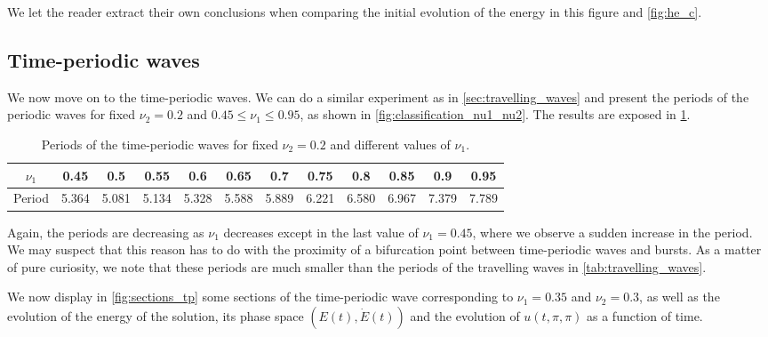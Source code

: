 \documentclass[twoside]{article}
\begin{document}
We let the reader extract their own conclusions when comparing the initial evolution of the energy in this figure and \cref{fig:he_c}.
\subsection{Time-periodic waves}\label{sec:time_periodic_waves}
We now move on to the time-periodic waves. We can do a similar experiment as in \cref{sec:travelling_waves} and present the periods of the periodic waves for fixed $\nu_2=0.2$ and $0.45\leq \nu_1\leq 0.95$, as shown in \cref{fig:classification_nu1_nu2}. The results are exposed in \cref{tab:time_periodic_waves}.

\begin{table}[H]
  \centering
  \begin{tabular}{|c||ccccccccccc|}
    \hline
    $\nu_1$ & 0.45  & 0.5   & 0.55  & 0.6   & 0.65  & 0.7   & 0.75  & 0.8   & 0.85  & 0.9   & 0.95  \\ \hline
    Period  & 5.364 & 5.081 & 5.134 & 5.328 & 5.588 & 5.889 & 6.221 & 6.580 & 6.967 & 7.379 & 7.789 \\
    \hline
  \end{tabular}
  \caption{Periods of the time-periodic waves for fixed $\nu_2=0.2$ and different values of $\nu_1$.}
  \label{tab:time_periodic_waves}
\end{table}
Again, the periods are decreasing as $\nu_1$ decreases except in the last value of $\nu_1=0.45$, where we observe a sudden increase in the period. We may suspect that this reason has to do with the proximity of a bifurcation point between time-periodic waves and bursts. As a matter of pure curiosity, we note that these periods are much smaller than the periods of the travelling waves in \cref{tab:travelling_waves}.

We now display in \cref{fig:sections_tp} some sections of the time-periodic wave corresponding to $\nu_1=0.35$ and $\nu_2=0.3$, as well as the evolution of the energy of the solution, its phase space $(E(t), \dot{E}(t))$ and the evolution of $u(t,\pi,\pi)$ as a function of time.
\end{document}
